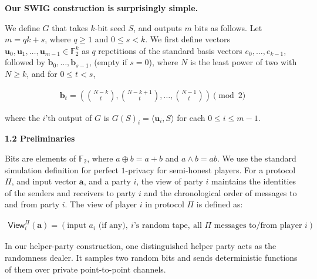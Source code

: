\documentclass[10pt,a4paper]{article}
\begin{document}
\par\medskip\noindent\textbf{Our SWIG construction is surprisingly simple.}\par




We define $G$ that takes $k$-bit seed $S$, and outputs $m$ bits as follows.
Let $m=qk+s$, where $q\geq 1$ and $0\leq s<k$. We first define vectors $\mathbf{u}_{0},\mathbf{u}_{1},\ldots,\mathbf{u}_{m-1}\in\mathbb{F}_{2}^{k}$ as
$q$ repetitions of
the standard basis vectors $e_{0},\ldots,e_{k-1}$, followed by $\mathbf{b}_{0},\ldots,\mathbf{b}_{s-1}$, (empty if
$s=0$), where $N$ is the least power of two with $N\geq k$, and for
$0\leq t<s$,\par


\[\begin{gathered}
\mathbf{b}_{t}=\left(\binom{N-k}{t},\binom{N-k+1}{t},\ldots,\binom{N-1}{t}\right)\pmod{2}
\end{gathered}\]


where the $i$’th output of $G$ is
$G(S)_{i}=\langle\mathbf{u}_{i},S\rangle$ for each $0\leq i\leq m-1$.\par






\par\medskip\noindent\textbf{
1.2 Preliminaries}\par




Bits are elements of $\mathbb{F}_{2}$, where $a\oplus b=a+b$ and $a\wedge b=ab$.
We use the standard simulation definition for perfect $1$-privacy for semi-honest players. For a protocol $\Pi$, and input vector $\mathbf{a}$, and a party $i$, the view of party $i$ maintains the identities of the senders and receivers to party $i$ and the chronological order of messages to and from party $i$. The view of player $i$ in protocol $\Pi$ is defined as:\par


\[\begin{gathered}
\mathsf{View}_{i}^{\Pi}(\mathbf{a})=(\text{input }a_{i}\text{ (if any)},\ \text{$i$'s random tape},\ \text{all $\Pi$ messages to/from player $i$})
\end{gathered}\]


In our helper-party construction, one distinguished helper party acts as the randomness dealer. It samples two random bits and sends deterministic functions of them over private point-to-point channels.\par
\end{document}
